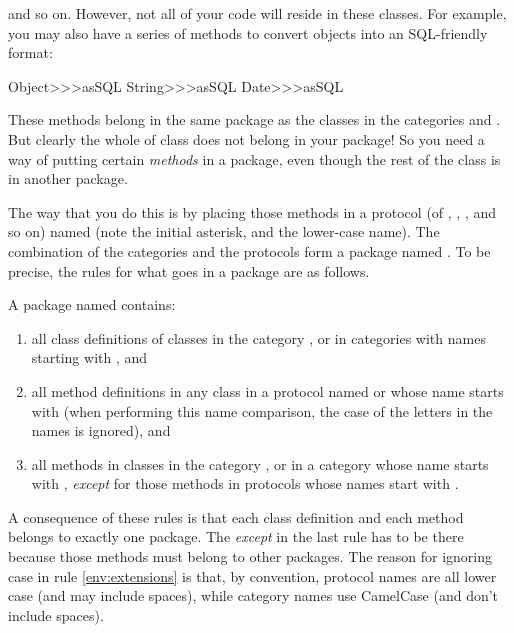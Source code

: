 \documentclass[a4paper,10pt,twoside]{book}
\begin{document}
\vspace{1ex}
\noindent
and so on. However, not all of your code will reside in these classes. For example, you may also have a series of methods to convert objects into an SQL-friendly format:

\begin{code}{}
Object>>>asSQL
String>>>asSQL
Date>>>asSQL
\end{code}

\noindent
These methods belong in  the same package as the classes in the 
categories  and . 
But clearly the whole of class  does not belong in your package! 
So you need a way of putting certain \emph{methods} in a package, even though the rest of the class is in another package.

The way that you do this is by placing those methods in a protocol (of , , , and so on) named  (note the initial asterisk, and the lower-case name). The combination of the  categories and the  protocols form a package named .
To be precise, the rules for what goes in a package are as follows.

A package named  contains:

\begin{enumerate}		\label{sec:packageRules}
	\item{} all class definitions of classes in the category , or in categories with names starting with , and
	\item{} \label{env:extensions} all method definitions in any class in a protocol named  or whose name starts with  (when performing this name comparison, the case of the letters in the names is ignored), and
	\item{} all methods in classes in the category , or in a category whose name starts with , \emph{except} for those methods in protocols whose names start with \prot{*}.
	
\end{enumerate}
\noindent
A consequence of these rules is that each class definition and each method belongs to exactly one package. The \emph{except} in the last rule has to be there because those methods must belong to other packages.   The reason for ignoring case in rule \ref{env:extensions} is that, by convention, protocol names are all lower case (and may include spaces), while category names use CamelCase (and don't include spaces).
\end{document}

